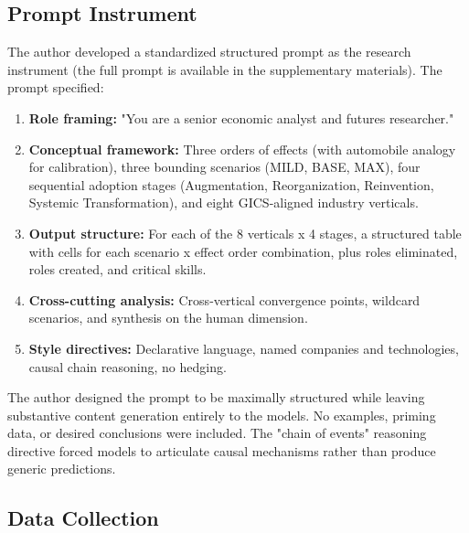 \documentclass[preprint,review,12pt]{elsarticle}
\begin{document}
\subsection{Prompt Instrument}
\label{sec:prompt_instrument}

The author developed a standardized structured prompt as the research instrument (the full prompt is available in the supplementary materials). The prompt specified:

\begin{enumerate}
 \item \textbf{Role framing:} "You are a senior economic analyst and futures researcher."
 \item \textbf{Conceptual framework:} Three orders of effects (with automobile analogy for calibration), three bounding scenarios (MILD, BASE, MAX), four sequential adoption stages (Augmentation, Reorganization, Reinvention, Systemic Transformation), and eight GICS-aligned industry verticals.
 \item \textbf{Output structure:} For each of the 8 verticals x 4 stages, a structured table with cells for each scenario x effect order combination, plus roles eliminated, roles created, and critical skills.
 \item \textbf{Cross-cutting analysis:} Cross-vertical convergence points, wildcard scenarios, and synthesis on the human dimension.
 \item \textbf{Style directives:} Declarative language, named companies and technologies, causal chain reasoning, no hedging.

\end{enumerate}
The author designed the prompt to be maximally structured while leaving substantive content generation entirely to the models. No examples, priming data, or desired conclusions were included. The "chain of events" reasoning directive forced models to articulate causal mechanisms rather than produce generic predictions.


\subsection{Data Collection}
\label{sec:data_collection}
\end{document}
